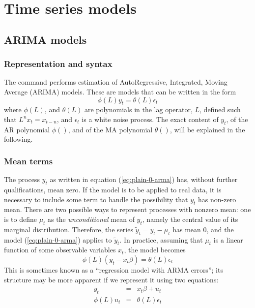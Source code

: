 \chapter{Time series models}
\label{chap:timeser}

\section{ARIMA models}
\label{arma-estimation}

\subsection{Representation and syntax}
\label{arma-repr}

The  command performs estimation of AutoRegressive,
Integrated, Moving Average (ARIMA) models.  These are models that can
be written in the form
\begin{equation}
  \label{eq:plain-0-arma}
  \phi(L) y_t = \theta(L) \epsilon_t
\end{equation}
where $\phi(L)$, and $\theta(L)$ are polynomials in the lag operator,
$L$, defined such that $L^n x_t = x_{t-n}$, and $\epsilon_t$ is a
white noise process. The exact content of $y_t$, of the AR polynomial
$\phi()$, and of the MA polynomial $\theta()$, will be explained in the
following.

\subsection{Mean terms}
\label{sec:arma-nonzeromean}

The process $y_t$ as written in equation (\ref{eq:plain-0-arma}) has,
without further qualifications, mean zero. If the model is to be
applied to real data, it is necessary to include some term to handle
the possibility that $y_t$ has non-zero mean. There are two possible
ways to represent processes with nonzero mean: one is to define $\mu_t$
as the \emph{unconditional} mean of $y_t$, namely the central value of
its marginal distribution. Therefore, the series $\tilde{y}_t = y_t -
\mu_t$ has mean 0, and the model (\ref{eq:plain-0-arma}) applies to
$\tilde{y}_t$. In practice, assuming that $\mu_t$ is a linear function
of some observable variables $x_t$, the model becomes
\begin{equation}
  \label{eq:arma-with-x}
  \phi(L) (y_t - x_t \beta) = \theta(L) \epsilon_t
\end{equation}
This is sometimes known as a ``regression model with ARMA errors'';
its structure may be more apparent if we represent it using two
equations:
\begin{eqnarray*}
  y_t & = & x_t \beta + u_t \\
  \phi(L) u_t & = & \theta(L) \epsilon_t
\end{eqnarray*}

